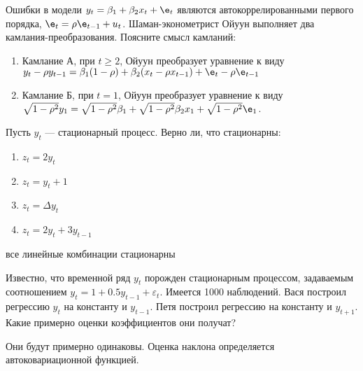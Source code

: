 \begin{problem}
Ошибки в модели $y_t=\beta_1+\beta_2 x_{t}+\e_t$ являются автокоррелированными первого порядка, $\e_t=\rho \e_{t-1}+u_t$. Шаман-эконометрист Ойуун выполняет два камлания-преобразования. Поясните смысл камланий:
\begin{enumerate}
\item Камлание А, при $t\geq 2$, Ойуун преобразует уравнение к виду $y_t-\rho y_{t-1}=\beta_1(1-\rho)+ \beta_2(x_t-\rho x_{t-1})+\e_t-\rho \e_{t-1}$
\item Камлание Б, при $t=1$, Ойуун преобразует уравнение к виду $\sqrt{1-\rho^2}y_1=\sqrt{1-\rho^2}\beta_1+\sqrt{1-\rho^2}\beta_2 x_1+\sqrt{1-\rho^2}\e_1$.
\end{enumerate}
\end{problem}

\begin{solution}
\end{solution}


\begin{problem}
Пусть $y_{t}$ --- стационарный процесс. Верно ли, что стационарны: 
\begin{enumerate}
\item $z_{t}=2y_{t}$ 
\item $z_{t}=y_{t}+1$ 
\item $z_{t}=\Delta y_{t}$ 
\item $z_{t}=2y_{t}+3y_{t-1}$ 
\end{enumerate} 
\end{problem}

\begin{solution}
все линейные комбинации стационарны
\end{solution}





\begin{problem}
Известно, что временной ряд $y_{t}$ порожден стационарным процессом, задаваемым соотношением $y_{t}=1+0.5y_{t-1}+\varepsilon_{t}$. Имеется 1000 наблюдений. Вася построил регрессию $y_{t}$ на константу и $y_{t-1}$. Петя построил регрессию на константу и $y_{t+1}$. Какие примерно оценки коэффициентов они получат? 
\end{problem}

\begin{solution}
Они будут примерно одинаковы. Оценка наклона определяется автоковариационной функцией.
\end{solution}



